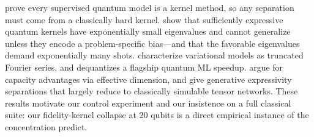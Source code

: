 \citet{schuld2021models} prove every supervised quantum model is a kernel method,
so any separation must come from a classically hard kernel.
\citet{kubler2021inductive} show that sufficiently expressive quantum kernels have
exponentially small eigenvalues and cannot generalize unless they encode a
problem-specific bias---and that the favorable eigenvalues demand exponentially
many shots. \citet{schuld2021effect} characterize variational models as truncated
Fourier series, and \citet{tang2019quantum} dequantizes a flagship quantum ML
speedup. \citet{abbas2021power} argue for capacity advantages via effective
dimension, and \citet{du2020expressive,gao2022enhancing} give generative
expressivity separations that largely reduce to classically simulable tensor
networks. These results motivate our control experiment and our insistence on a
full classical suite: our fidelity-kernel collapse at 20 qubits is a direct
empirical instance of the concentration \citeauthor{kubler2021inductive} predict.
